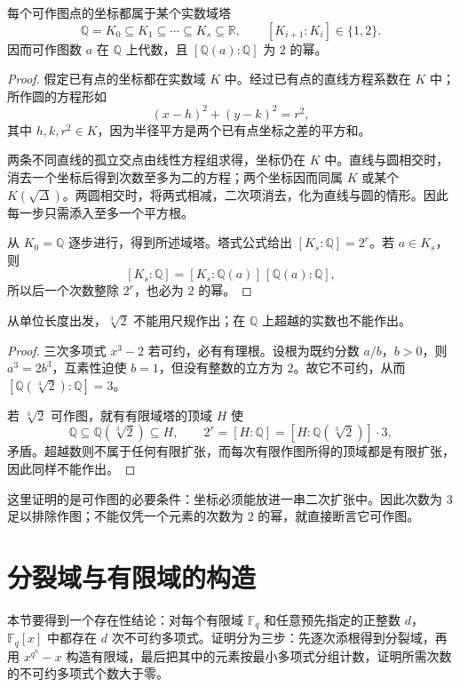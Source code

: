 \documentclass[lang=cn,a4paper,fontset=none,zihao=false,10pt,openany,twoside]{beautybook}
\numberwithin{algorithm}{chapter}
\begin{document}
\begin{proposition}[作图产生二次扩张塔]\label{prop:constructible-tower}
每个可作图点的坐标都属于某个实数域塔
\[
 \mathbb Q=K_0\subseteq K_1\subseteq\cdots\subseteq K_s\subseteq\mathbb R,
 \qquad [K_{i+1}:K_i]\in\{1,2\}.
\]
因而可作图数 $a$ 在 $\mathbb Q$ 上代数，且 $[\mathbb Q(a):\mathbb Q]$ 为 $2$ 的幂。
\end{proposition}
\begin{proof}
假定已有点的坐标都在实数域 $K$ 中。经过已有点的直线方程系数在 $K$ 中；所作圆的方程形如
\[
 (x-h)^2+(y-k)^2=r^2,
\]
其中 $h,k,r^2\in K$，因为半径平方是两个已有点坐标之差的平方和。

两条不同直线的孤立交点由线性方程组求得，坐标仍在 $K$ 中。直线与圆相交时，消去一个坐标后得到次数至多为二的方程；两个坐标因而同属 $K$ 或某个 $K(\sqrt\Delta)$。两圆相交时，将两式相减，二次项消去，化为直线与圆的情形。因此每一步只需添入至多一个平方根。

从 $K_0=\mathbb Q$ 逐步进行，得到所述域塔。塔式公式给出 $[K_s:\mathbb Q]=2^r$。若 $a\in K_s$，则
\[
 [K_s:\mathbb Q]=[K_s:\mathbb Q(a)]\,[\mathbb Q(a):\mathbb Q],
\]
所以后一个次数整除 $2^r$，也必为 $2$ 的幂。
\end{proof}
\begin{example}[倍立方的障碍]
从单位长度出发，$\sqrt[3]2$ 不能用尺规作出；在 $\mathbb Q$ 上超越的实数也不能作出。
\end{example}
\begin{proof}
三次多项式 $x^3-2$ 若可约，必有有理根。设根为既约分数 $a/b$，$b>0$，则 $a^3=2b^3$，互素性迫使 $b=1$，但没有整数的立方为 $2$。故它不可约，从而 $[\mathbb Q(\sqrt[3]2):\mathbb Q]=3$。

若 $\sqrt[3]2$ 可作图，就有有限域塔的顶域 $H$ 使
\[
 \mathbb Q\subseteq\mathbb Q(\sqrt[3]2)\subseteq H,
 \qquad 2^r=[H:\mathbb Q]=[H:\mathbb Q(\sqrt[3]2)]\cdot3,
\]
矛盾。超越数则不属于任何有限扩张，而每次有限作图所得的顶域都是有限扩张，因此同样不能作出。
\end{proof}
\begin{remark}[次数条件的作用]
这里证明的是可作图的必要条件：坐标必须能放进一串二次扩张中。因此次数为 $3$ 足以排除作图；不能仅凭一个元素的次数为 $2$ 的幂，就直接断言它可作图。
\end{remark}

\section{分裂域与有限域的构造}\label{sec:splitting-finite-route}
本节要得到一个存在性结论：对每个有限域 $\mathbb F_q$ 和任意预先指定的正整数 $d$，$\mathbb F_q[x]$ 中都存在 $d$ 次不可约多项式。证明分为三步：先逐次添根得到分裂域，再用 $x^{q^n}-x$ 构造有限域，最后把其中的元素按最小多项式分组计数，证明所需次数的不可约多项式个数大于零。
\end{document}

